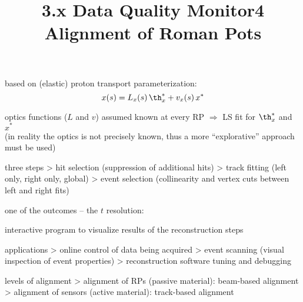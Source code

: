 \> based on (elastic) proton transport parameterization:
$$x(s) = L_x(s)\,\th_x^* + v_x(s)\,x^*$$

\> optics functions ($L$ and $v$) assumed known at every RP $\Rightarrow$ LS fit for $\th_x^*$ and $x^*$\\
(in reality the optics is not precisely known, thus a more ``explorative'' approach must be used)

\> three steps
\>> hit selection (suppression of additional hits)
\>> track fitting (left only, right only, global)
\>> event selection (collinearity and vertex cuts between left and right fits)

\> one of the outcomes -- the $t$ resolution:



\newpage%
\title{3.x Data Quality Monitor}

\> interactive program to visualize results of the reconstruction steps

\> applications
\>> online control of data being acquired
\>> event scanning (visual inspection of event properties)
\>> reconstruction software tuning and debugging



\newpage%
\title{4 Alignment of Roman Pots}


\vfil

 levels of alignment
\>> alignment of RPs (passive material): beam-based alignment
\>> alignment of sensors (active material): track-based alignment 

\vfil


